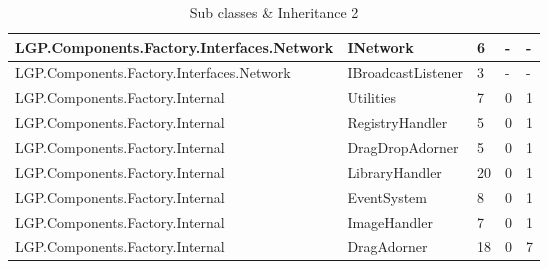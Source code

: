 \begin{table}[h!t]
{\begin{tabular}{ | p{65mm} | p{33mm} | p{10mm} | p{10mm} | p{10mm}  | }
				LGP.Components.Factory.Interfaces.Network & INetwork & 6     & -     & -  \\ \hline
				LGP.Components.Factory.Interfaces.Network & IBroadcastListener & 3     & -     & -  \\ \hline
				LGP.Components.Factory.Internal & Utilities & 7     & 0     & 1  \\ \hline
				LGP.Components.Factory.Internal & RegistryHandler & 5     & 0     & 1  \\ \hline
				LGP.Components.Factory.Internal & DragDropAdorner & 5     & 0     & 1  \\ \hline
				LGP.Components.Factory.Internal & LibraryHandler & \cellcolor{ored}20    & 0     & 1  \\ \hline
				LGP.Components.Factory.Internal & EventSystem & 8     & 0     & 1  \\ \hline
				LGP.Components.Factory.Internal & ImageHandler & 7     & 0     & 1  \\ \hline
				LGP.Components.Factory.Internal & DragAdorner & \cellcolor{ored}18    & 0     & 7  \\ \hline
				\end{tabular}}
				
				\caption{Sub classes \& Inheritance 2}			
				\label{tab:SubclassesInheritance2}
				
			\end{table}
			
		\newpage
			
